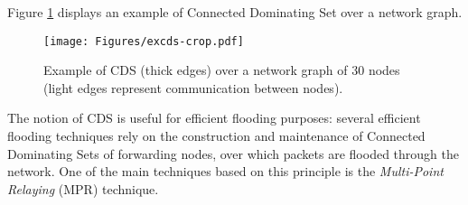 Figure \ref{f:ex_cds} displays an example of Connected Dominating Set over a network graph.

\begin{figure}[htb]	%
\centering
\texttt{[image: Figures/excds-crop.pdf]} %
\caption{Example of CDS (thick edges) over a network graph of 30 nodes (light edges represent communication between nodes).}
\label{f:ex_cds}
\end{figure}

The notion of CDS is useful for efficient flooding purposes: several efficient flooding techniques rely on the construction and maintenance of Connected Dominating Sets of forwarding nodes, over which packets are flooded through the network. One of the main techniques based on this principle is the {\em Multi-Point Relaying} (MPR) technique.

